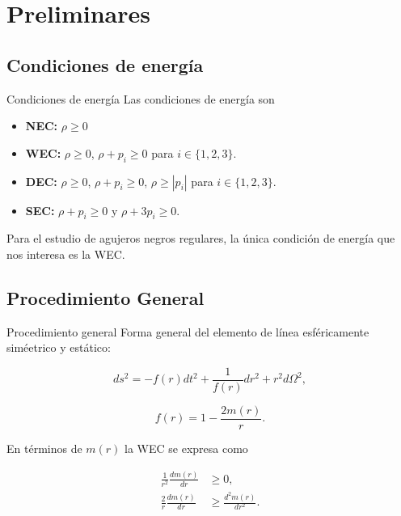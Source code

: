 \documentclass[t]{beamer}
\numberwithin{equation}{section}
\begin{document}
\section{\label{preliminaries section} Preliminares}


\subsection{Condiciones de energía}

\begin{frame}{Condiciones de energía}
\vspace{\fill}
Las condiciones de energía son \cite{carroll}

\begin{itemize}
\item \textbf{NEC:} $\rho \geq 0$

\item \textbf{WEC:} $\rho \geq 0$,  $\rho + p_{i} \geq 0$ para $i \in \{1,2,3\}$.

\item \textbf{DEC:} $\rho \geq 0$,  $\rho + p_{i} \geq 0$, $\rho \geq |p_{i}|$ para $i \in \{1,2,3\}$.

\item \textbf{SEC:} $\rho + p_{i} \geq 0$ y $\rho + 3p_{i} \geq 0$.
\end{itemize}


Para el estudio de agujeros negros regulares, la única condición de energía que nos interesa es la WEC.
\vspace{\fill}
\end{frame}

\subsection{Procedimiento General}

\begin{frame}{Procedimiento general}
Forma general del elemento de línea esféricamente siméetrico y estático:

\begin{equation}
\label{general static spherical}
ds^2 = -f(r)dt^2 + \frac{1}{f(r)}dr^2 + r^2d\Omega^2,
\end{equation}

\begin{equation}
\label{general f}
f(r) = 1 - \frac{2m(r)}{r}.
\end{equation}

En términos de $m(r)$ la WEC se expresa como \cite{vanegas-weak}

\begin{equation}
\label{mass wec ineq}
\begin{aligned}
\frac{1}{r^2}\frac{dm(r)}{dr} &\geq 0,\\
\frac{2}{r}\frac{dm(r)}{dr} &\geq \frac{d^2m(r)}{dr^2}.
\end{aligned}
\end{equation}

\end{frame}
\end{document}
